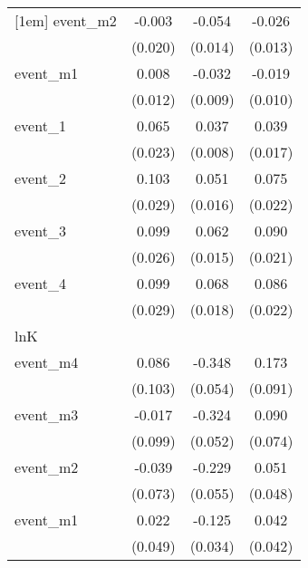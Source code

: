 {\begin{tabular}{l*{3}{c}}
[1em]
event\_m2    &      -0.003         &      -0.054\sym{***}&      -0.026         \\
            &     (0.020)         &     (0.014)         &     (0.013)         \\
[1em]
event\_m1    &       0.008         &      -0.032\sym{***}&      -0.019         \\
            &     (0.012)         &     (0.009)         &     (0.010)         \\
[1em]
event\_1     &       0.065\sym{**} &       0.037\sym{***}&       0.039\sym{*}  \\
            &     (0.023)         &     (0.008)         &     (0.017)         \\
[1em]
event\_2     &       0.103\sym{***}&       0.051\sym{**} &       0.075\sym{***}\\
            &     (0.029)         &     (0.016)         &     (0.022)         \\
[1em]
event\_3     &       0.099\sym{***}&       0.062\sym{***}&       0.090\sym{***}\\
            &     (0.026)         &     (0.015)         &     (0.021)         \\
[1em]
event\_4     &       0.099\sym{***}&       0.068\sym{***}&       0.086\sym{***}\\
            &     (0.029)         &     (0.018)         &     (0.022)         \\
\hline
lnK         &                     &                     &                     \\
event\_m4    &       0.086         &      -0.348\sym{***}&       0.173         \\
            &     (0.103)         &     (0.054)         &     (0.091)         \\
[1em]
event\_m3    &      -0.017         &      -0.324\sym{***}&       0.090         \\
            &     (0.099)         &     (0.052)         &     (0.074)         \\
[1em]
event\_m2    &      -0.039         &      -0.229\sym{***}&       0.051         \\
            &     (0.073)         &     (0.055)         &     (0.048)         \\
[1em]
event\_m1    &       0.022         &      -0.125\sym{***}&       0.042         \\
            &     (0.049)         &     (0.034)         &     (0.042)         \\

\end{tabular}}
